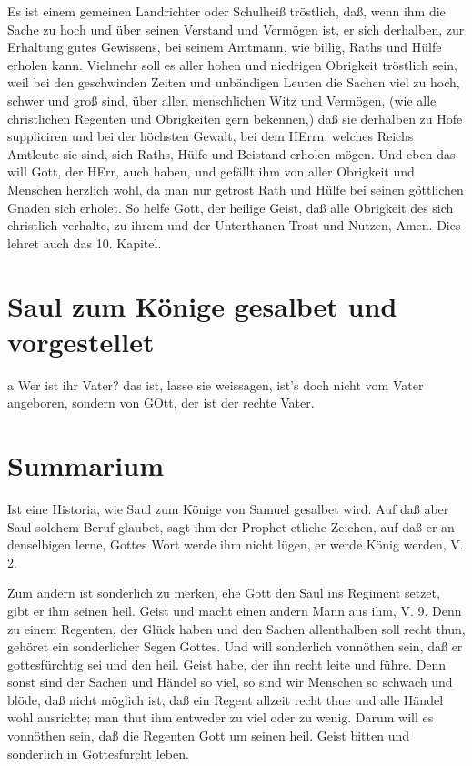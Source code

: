 Es ist einem gemeinen Landrichter oder Schulheiß tröstlich, daß, wenn ihm die Sache zu hoch und über seinen Verstand und Vermögen ist, er sich derhalben, zur Erhaltung gutes Gewissens, bei seinem Amtmann, wie billig, Raths und Hülfe erholen kann. Vielmehr soll es aller hohen und niedrigen Obrigkeit tröstlich sein, weil bei den geschwinden Zeiten und unbändigen Leuten die Sachen viel zu hoch, schwer und groß sind, über allen menschlichen Witz und Vermögen, (wie alle christlichen Regenten und Obrigkeiten gern bekennen,) daß sie derhalben zu Hofe suppliciren und bei der höchsten Gewalt, bei dem HErrn, welches Reichs Amtleute sie sind, sich Raths, Hülfe und Beistand erholen mögen. Und eben das will Gott, der HErr, auch haben, und gefällt ihm von aller Obrigkeit und Menschen herzlich wohl, da man nur getrost Rath und Hülfe bei seinen göttlichen Gnaden sich erholet. So helfe Gott, der heilige Geist, daß alle Obrigkeit des sich christlich verhalte, zu ihrem und der Unterthanen Trost und Nutzen, Amen. Dies lehret auch das 10. Kapitel.

\section{Saul zum Könige gesalbet und vorgestellet}

a Wer ist ihr Vater? das ist, lasse sie weissagen, ist's doch nicht vom Vater angeboren, sondern von GOtt, der ist der rechte Vater.

\section{Summarium}

Ist eine Historia, wie Saul zum Könige von Samuel gesalbet wird. Auf daß aber Saul solchem Beruf glaubet, sagt ihm der Prophet etliche Zeichen, auf daß er an denselbigen lerne, Gottes Wort werde ihm nicht lügen, er werde König werden, V. 2.

Zum andern ist sonderlich zu merken, ehe Gott den Saul ins Regiment setzet, gibt er ihm seinen heil. Geist und macht einen andern Mann aus ihm, V. 9. Denn zu einem Regenten, der Glück haben und den Sachen allenthalben soll recht thun, gehöret ein sonderlicher Segen Gottes. Und will sonderlich vonnöthen sein, daß er gottesfürchtig sei und den heil. Geist habe, der ihn recht leite und führe. Denn sonst sind der Sachen und Händel so viel, so sind wir Menschen so schwach und blöde, daß nicht möglich ist, daß ein Regent allzeit recht thue und alle Händel wohl ausrichte; man thut ihm entweder zu viel oder zu wenig. Darum will es vonnöthen sein, daß die Regenten Gott um seinen heil. Geist bitten und sonderlich in Gottesfurcht leben.

